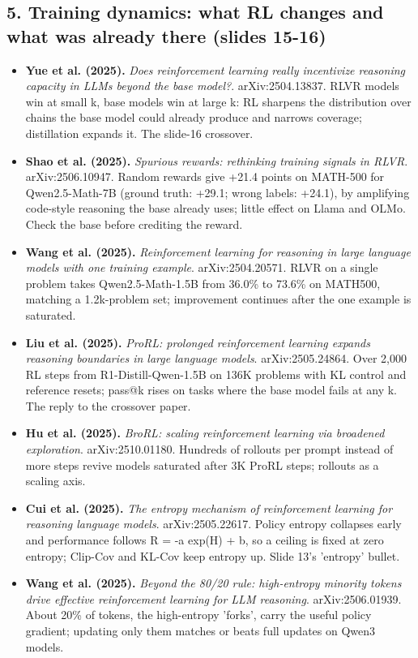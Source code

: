 \subsection*{5. Training dynamics: what RL changes and what was already there (slides 15-16)}
\begin{itemize}[leftmargin=1.2em,itemsep=3pt]\sloppy
\item \textbf{Yue et al. (2025).} \textit{Does reinforcement learning really incentivize reasoning capacity in LLMs beyond the base model?}. arXiv:2504.13837. RLVR models win at small k, base models win at large k: RL sharpens the distribution over chains the base model could already produce and narrows coverage; distillation expands it. The slide-16 crossover.
\item \textbf{Shao et al. (2025).} \textit{Spurious rewards: rethinking training signals in RLVR}. arXiv:2506.10947. Random rewards give +21.4 points on MATH-500 for Qwen2.5-Math-7B (ground truth: +29.1; wrong labels: +24.1), by amplifying code-style reasoning the base already uses; little effect on Llama and OLMo. Check the base before crediting the reward.
\item \textbf{Wang et al. (2025).} \textit{Reinforcement learning for reasoning in large language models with one training example}. arXiv:2504.20571. RLVR on a single problem takes Qwen2.5-Math-1.5B from 36.0\% to 73.6\% on MATH500, matching a 1.2k-problem set; improvement continues after the one example is saturated.
\item \textbf{Liu et al. (2025).} \textit{ProRL: prolonged reinforcement learning expands reasoning boundaries in large language models}. arXiv:2505.24864. Over 2,000 RL steps from R1-Distill-Qwen-1.5B on 136K problems with KL control and reference resets; pass@k rises on tasks where the base model fails at any k. The reply to the crossover paper.
\item \textbf{Hu et al. (2025).} \textit{BroRL: scaling reinforcement learning via broadened exploration}. arXiv:2510.01180. Hundreds of rollouts per prompt instead of more steps revive models saturated after 3K ProRL steps; rollouts as a scaling axis.
\item \textbf{Cui et al. (2025).} \textit{The entropy mechanism of reinforcement learning for reasoning language models}. arXiv:2505.22617. Policy entropy collapses early and performance follows R = -a exp(H) + b, so a ceiling is fixed at zero entropy; Clip-Cov and KL-Cov keep entropy up. Slide 13's 'entropy' bullet.
\item \textbf{Wang et al. (2025).} \textit{Beyond the 80/20 rule: high-entropy minority tokens drive effective reinforcement learning for LLM reasoning}. arXiv:2506.01939. About 20\% of tokens, the high-entropy 'forks', carry the useful policy gradient; updating only them matches or beats full updates on Qwen3 models.

\end{itemize}
